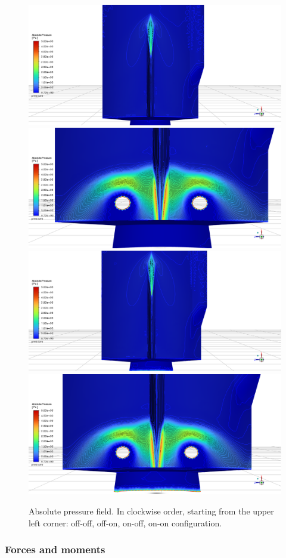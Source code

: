 \documentclass[12pt]{article}
\begin{document}
\begin{figure}[H]
    \centering
    \includegraphics[width=0.495\linewidth]{figs/t136s/vernier_zone_pabs_2_offoff.png}
    \includegraphics[width=0.495\linewidth]{figs/t136s/vernier_zone_pabs_2_offon.png}\\
    \includegraphics[width=0.495\linewidth]{figs/t136s/vernier_zone_pabs_2_onoff.png}
    \includegraphics[width=0.495\linewidth]{figs/t136s/vernier_zone_pabs_2_onon.png}
    \caption{Absolute pressure field. In clockwise order, starting from the upper left corner: off-off, off-on, on-off, on-on configuration.}
    \label{fig:pabs-conf-modes}
\end{figure}

\subsubsection*{Forces and moments}
\end{document}
